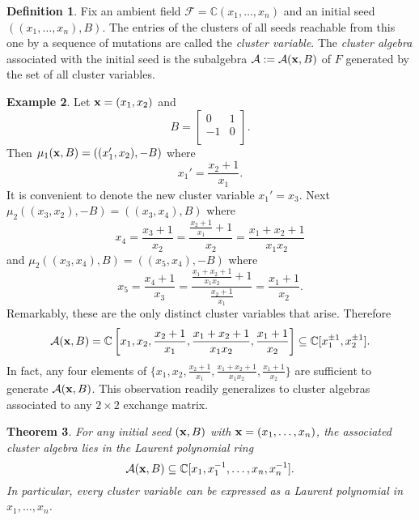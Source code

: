 \documentclass{amsart}
\newtheorem{theorem}{Theorem}[section]
\theoremstyle{definition}
\newtheorem{definition}[theorem]{Definition}
\newtheorem{example}[theorem]{Example}
\theoremstyle{remark}
\numberwithin{equation}{section}
\newcommand{\cA}{{\mathcal{A}}}
\newcommand{\cF}{{\mathcal{F}}}
\newcommand{\x}{{\bf x}}
\newcommand{\bx}{{\bf x}}
\newcommand{\CC}{{\mathbb{C}}}
\begin{document}
	
	\begin{definition}
		Fix an ambient field $\cF = \CC(x_1,\ldots, x_n)$ and an initial seed $((x_1,\ldots, x_n), B)$.  The entries of the clusters of all seeds reachable from this one by a sequence of mutations are called the \emph{cluster variable}.  The \emph{cluster algebra} associated with the initial seed is the subalgebra $\cA:=\cA(\bx,B)$ of $F$ generated by the set of all cluster variables.
	\end{definition}
	
	
  \begin{example}\label{example:type A2}
		Let $\x = (x_1,x_2)$ and
		\begin{displaymath}
			B = \left[ \begin{array}{cc}
			0 & 1 \\
			-1 & 0 \\
			\end{array}
			\right].
		\end{displaymath}
		Then $\mu_1(\x,B) = ((x_1',x_2), -B)$ where
		\begin{displaymath}
			x_1' = \frac{x_2+1}{x_1}.
		\end{displaymath}
		It is convenient to denote the new cluster variable $x_1'=x_3$.  Next $\mu_2((x_3,x_2),-B) = ((x_3,x_4),B)$ where
		\begin{displaymath}
			x_4 = \frac{x_3+1}{x_2} = \frac{\frac{x_2+1}{x_1}+1}{x_2} = \frac{x_1 + x_2 + 1}{x_1x_2}
		\end{displaymath}
		and  $\mu_2((x_3,x_4),B) = ((x_5,x_4),-B)$ where
		\begin{displaymath}
			x_5 = \frac{x_4+1}{x_3} = \frac{\frac{x_1 + x_2 + 1}{x_1x_2}+1}{\frac{x_2+1}{x_1}} = \frac{x_1+1}{x_2}.
		\end{displaymath}
		Remarkably, these are the only distinct cluster variables that arise.  Therefore
		\begin{displaymath}
			\cA(\x,B) = \CC\left[x_1,x_2,\frac{x_2+1}{x_1},\frac{x_1 + x_2 + 1}{x_1x_2},\frac{x_1+1}{x_2}\right] \subseteq \CC[x_1^{\pm1},x_2^{\pm1}].
		\end{displaymath}
    In fact, any four elements of $\{x_1,x_2,\frac{x_2+1}{x_1},\frac{x_1 + x_2 + 1}{x_1x_2},\frac{x_1+1}{x_2}\}$ are sufficient to generate $\cA(\x,B)$.  This observation readily generalizes to cluster algebras associated to any $2\times 2$ exchange matrix. %
  \end{example}
	
	\begin{theorem}\label{th:Laurent phenomenon}
		For any initial seed $(\x,B)$ with $\x = (x_1,\ldots, x_n)$, the associated cluster algebra lies in the Laurent polynomial ring
		\begin{displaymath}
			\cA(\x,B) \subseteq \CC[x_1, x_1^{-1}, \ldots, x_n, x_n^{-1}].
		\end{displaymath}
		In particular, every cluster variable can be expressed as a Laurent polynomial in $x_1,\ldots, x_n$.
	\end{theorem}
	
\end{document}
